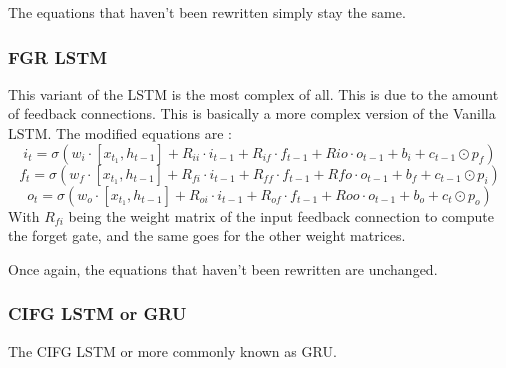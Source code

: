 The equations that haven't been rewritten simply stay the same.

\subsubsection{\acf{FGR} \ac{LSTM}}
This variant of the \ac{LSTM} is the most complex of all. This is due to the amount of feedback connections. This is basically a more complex version of the Vanilla \ac{LSTM}. The modified equations are :
\begin{equation}\label{eq:inputGVanilla}
  i_t=\sigma (w_i\cdot[x_{t_1},h_{t-1}]+ R_{ii}\cdot i_{t-1} + R_{if}\cdot f_{t-1} + R{io}\cdot o_{t-1} + b_i+c_{t-1}\odot p_f)
\end{equation}
\begin{equation}\label{eq:forgetGVanilla}
  f_t=\sigma (w_f\cdot[x_{t_1},h_{t-1}]+ R_{fi}\cdot i_{t-1} + R_{ff}\cdot f_{t-1} + R{fo}\cdot o_{t-1} + b_f+c_{t-1}\odot p_i)
\end{equation}
\begin{equation}\label{eq:ouputGVanilla}
  o_t=\sigma (w_o\cdot[x_{t_1},h_{t-1}]+ R_{oi}\cdot i_{t-1} + R_{of}\cdot f_{t-1} + R{oo}\cdot o_{t-1} + b_o+c_{t}\odot p_o)
\end{equation}
With $R_{fi}$ being the weight matrix of the input feedback connection to compute the forget gate, and the same goes for the other weight matrices.

Once again, the equations that haven't been rewritten are unchanged.

\subsubsection{\acf{CIFG} \ac{LSTM} or \acf{GRU}}
The \ac{CIFG} \ac{LSTM} or more commonly known as \ac{GRU}. \cite{gru,gruKeras,gruPyTorch}
